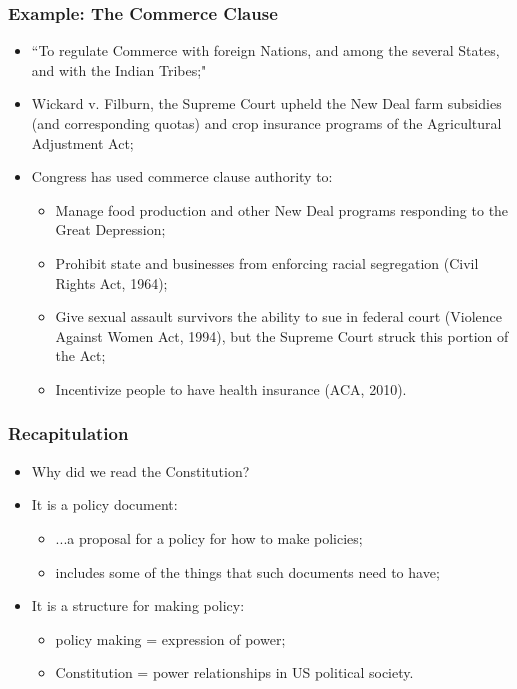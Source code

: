 \documentclass[aspectratio=169]{beamer}
\theoremstyle{principle}
\begin{document}
\begin{frame}
\frametitle{Example: The Commerce Clause}

\begin{itemize} 
\item ``To regulate Commerce with foreign Nations, and among the several States, and with the Indian Tribes;"
\bigskip

\item Wickard v. Filburn, the Supreme Court upheld the New Deal farm subsidies (and corresponding quotas) and crop insurance programs of the Agricultural Adjustment Act;
\bigskip

\item Congress has used commerce clause authority to:
\begin{itemize}
\item Manage food production and other New Deal programs responding to the Great Depression;
\item Prohibit state and businesses from enforcing racial segregation (Civil Rights Act, 1964);
\item Give sexual assault survivors the ability to sue in federal court (Violence Against Women Act, 1994), but the Supreme Court struck this portion of the Act;
\item Incentivize people to have health insurance (ACA, 2010).
\end{itemize}
\end{itemize}

\end{frame}

\begin{frame}
\frametitle{Recapitulation}

\begin{itemize} 
\item Why did we read the Constitution?
\bigskip
\bigskip
\item It is a policy document:
\begin{itemize}
\item ...a proposal for a policy for how to make policies;
\item includes some of the things that such documents need to have;
\end{itemize}
\bigskip
\bigskip
\item It is a structure for making policy:
\begin{itemize}
\item policy making = expression of power;
\item Constitution = power relationships in US political society.
\end{itemize}
\end{itemize}

\end{frame}
\end{document}
